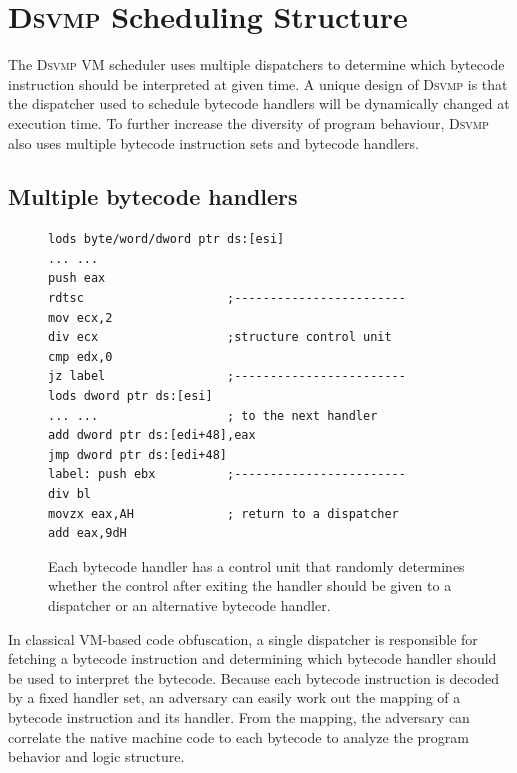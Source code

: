 \documentclass[preprint,12pt,3p]{elsarticle}
\newcommand{\DSVMP}{\textsc{Dsvmp}\xspace}
\begin{document}










\section{\DSVMP Scheduling Structure}\label{sec:dvs}

The \DSVMP VM scheduler uses multiple dispatchers to determine which bytecode instruction should be interpreted at given time.
A unique design of \DSVMP is that the dispatcher used to schedule bytecode handlers will be dynamically changed at execution time. To further increase the diversity of program behaviour, \DSVMP also uses multiple bytecode instruction sets and bytecode handlers.

\subsection{Multiple bytecode handlers}\label{sec:mb}

\begin{figure}[t!]
\scriptsize
\begin{lstlisting}
lods byte/word/dword ptr ds:[esi]
... ...
push eax
rdtsc                    ;------------------------
mov ecx,2
div ecx                  ;structure control unit
cmp edx,0
jz label                 ;------------------------
lods dword ptr ds:[esi]
... ...                  ; to the next handler
add dword ptr ds:[edi+48],eax
jmp dword ptr ds:[edi+48]
label: push ebx          ;------------------------
div bl
movzx eax,AH             ; return to a dispatcher
add eax,9dH
\end{lstlisting}
\caption{Each bytecode handler has a control unit that randomly determines whether the control after exiting the handler should be given to a dispatcher or an alternative bytecode handler. }
\label{fig:newhandler}
\end{figure}

In classical VM-based code obfuscation, a single dispatcher is responsible for fetching a bytecode instruction and
determining which bytecode handler should be used to interpret the bytecode. Because each bytecode instruction
is decoded by a fixed handler set, an adversary can easily work out the mapping of a bytecode instruction and its
handler. From the mapping, the adversary can correlate the native machine code to each bytecode to analyze the
program behavior and logic structure.
\end{document}
